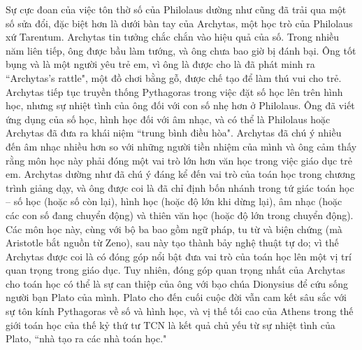 \begin{multicols}{2}
	\vskip 0.05cm
	Sự cực đoan của việc tôn thờ số của Philolaus dường như cũng đã trải qua một số sửa đổi, đặc biệt hơn là dưới bàn tay của Archytas, một học trò của Philolaus xứ Tarentum. 
	\vskip 0.05cm
	Archytas tin tưởng chắc chắn vào hiệu quả của số. Trong nhiều năm liên tiếp, ông được bầu làm tướng, và ông chưa bao giờ bị đánh bại. Ông tốt bụng và là một người yêu trẻ em, vì ông là được cho là đã phát minh ra ``Archytas’s rattle", một đồ chơi bằng gỗ, được chế tạo để làm thú vui cho trẻ. Archytas tiếp tục truyền thống Pythagoras trong việc đặt số học lên trên hình học, nhưng sự nhiệt tình của ông đối với con số nhẹ hơn ở Philolaus.  Ông đã viết ứng dụng của số học, hình học đối với âm nhạc, và có thể là Philolaus hoặc Archytas đã đưa ra khái niệm ``trung bình điều hòa". 
	\vskip 0.05cm
	Archytas đã chú ý nhiều đến âm nhạc nhiều hơn so với những người tiền nhiệm của mình và ông cảm thấy rằng môn học này phải đóng một vai trò lớn hơn văn học trong việc giáo dục trẻ em. Archytas dường như đã chú ý đáng kể đến vai trò của toán học trong chương trình giảng dạy, và ông được coi là đã chỉ định bốn nhánh trong tứ giác toán học -- số học (hoặc số còn lại), hình học (hoặc độ lớn khi dừng lại), âm nhạc (hoặc các con số đang chuyển động) và thiên văn học (hoặc độ lớn trong chuyển động). Các môn học này, cùng với bộ ba bao gồm ngữ pháp, tu từ và biện chứng (mà Aristotle bắt nguồn từ Zeno), sau này tạo thành bảy nghệ thuật tự do; vì thế Archytas được coi là có đóng góp nổi bật đưa vai trò của toán học lên một vị trí quan trọng trong giáo dục. 
	\vskip 0.05cm
	Tuy nhiên, đóng góp quan trọng nhất của Archytas cho toán học có thể là sự can thiệp của ông với bạo chúa Dionysius để cứu sống người bạn Plato của mình. Plato cho đến cuối cuộc đời vẫn cam kết sâu sắc với sự tôn kính Pythagoras về số và hình học, và vị thế tối cao của Athens trong thế giới toán học của thế kỷ thứ tư TCN là kết quả chủ yếu từ sự nhiệt tình của Plato, ``nhà tạo ra các nhà toán học." 
	\begin{figure}[H]
		\vspace*{-5pt}
		\centering
		\captionsetup{labelformat= empty, justification=centering}

\end{figure}
\end{multicols}
